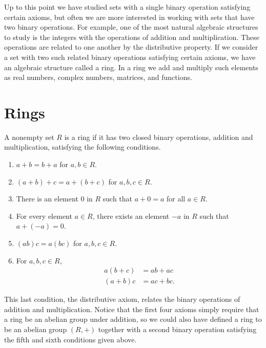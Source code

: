  
Up to this point we have studied sets with a single binary operation
satisfying certain axioms, but often we are more interested in working
with sets that have two binary operations.  For example, one of the
most natural algebraic structures to study is the integers 
with the operations of addition and multiplication. These operations
are related to one another by the distributive
property. If we consider a set with two such related binary operations
satisfying certain axioms, we have an algebraic structure called a
ring. In a ring we add and multiply such elements as real numbers,
complex numbers, matrices, and functions. 
 

\section{Rings}

A nonempty set $R$ is a {\bfi ring\/} if
it has two closed binary operations, addition and multiplication,
satisfying the following conditions.  
\begin{enumerate}
 
\item
$a + b = b + a$ for $a, b \in R$.
 
\item
$(a + b) + c = a + ( b + c)$ for $a, b, c  \in R$.
 
\item
There is an element $0$ in $R$ such that $a + 0 = a$ for all $a \in
R$. 
 
\item
For every element $a \in R$, there exists an element $-a$ in $R$ such
that $a + (-a) = 0$. 
 
\item
$(ab)  c = a  ( b  c)$ for $a, b, c  \in R$.
 
\item
For $a, b, c \in R$,
\begin{align*}
a( b + c)&= ab +ac \\
(a + b)c & = ac + bc.
\end{align*}
 
\end{enumerate}
This last condition, the distributive axiom, relates the binary
operations of addition and multiplication. Notice that the first four
axioms simply require that a ring be an abelian group under addition,
so we could also have defined a ring to be an abelian group
$(R, +)$ together with a second binary operation satisfying the fifth
and sixth conditions given above.  
 
